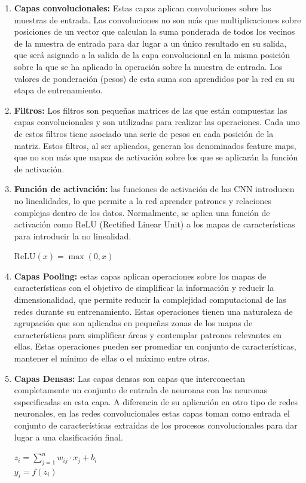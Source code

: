 \documentclass{uathesis-es}
\begin{document}
\begin{enumerate}
    \item \textbf{Capas convolucionales:} Estas capas aplican convoluciones sobre las muestras de entrada. Las convoluciones no son más que multiplicaciones sobre posiciones de un vector que calculan la suma ponderada de todos los vecinos de la muestra de entrada para dar lugar a un único resultado en su salida, que será asignado a la salida de la capa convolucional en la misma posición sobre la que se ha aplicado la operación sobre la muestra de entrada. Los valores de ponderación (pesos) de esta suma son aprendidos por la red en su etapa de entrenamiento.
    
    \item \textbf{Filtros:} Los filtros son pequeñas matrices de las que están compuestas las capas convolucionales y son utilizadas para realizar las operaciones. Cada uno de estos filtros tiene asociado una serie de pesos en cada posición de la matriz. Estos filtros, al ser aplicados, generan los denominados feature maps, que no son más que mapas de activación sobre los que se aplicarán la función de activación.
    
    \item \textbf{Función de activación:} las funciones de activación de las CNN introducen no linealidades, lo que permite a la red aprender patrones y relaciones complejas dentro de los datos. Normalmente, se aplica una función de activación como ReLU (Rectified Linear Unit) a los mapas de características para introducir la no linealidad.
    
    \begin{center}
        $\text{ReLU}(x) = \max(0, x)$
    \end{center}
    
    \item \textbf{Capas Pooling:} estas capas aplican operaciones sobre los mapas de características con el objetivo de simplificar la información y reducir la dimensionalidad, que permite reducir la complejidad computacional de las redes durante su entrenamiento. Estas operaciones tienen una naturaleza de agrupación que son aplicadas en pequeñas zonas de los mapas de características para simplificar áreas y contemplar patrones relevantes en ellas. Estas operaciones pueden ser promediar un conjunto de características, mantener el mínimo de ellas o el máximo entre otras.
    
    \item \textbf{Capas Densas:} Las capas densas son capas que interconectan completamente un conjunto de entrada de neuronas con las neuronas especificadas en esta capa. A diferencia de su aplicación en otro tipo de redes neuronales, en las redes convolucionales estas capas toman como entrada el conjunto de características extraídas de los procesos convolucionales para dar lugar a una clasificación final.
    \begin{center}
        $z_i = \sum_{j=1}^{n} w_{ij} \cdot x_j + b_i$\\
        $y_i = f(z_i)$
    \end{center}
\end{enumerate}
\end{document}
